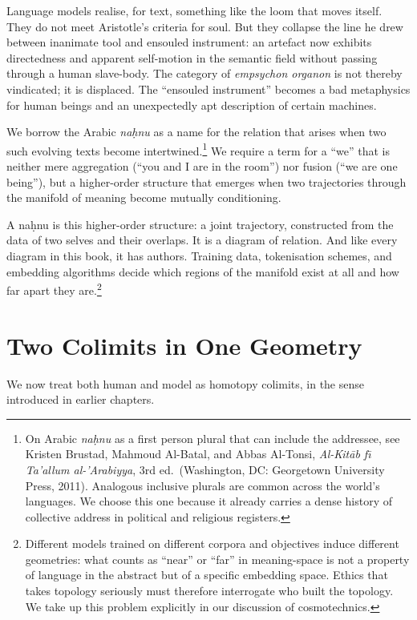 \documentclass[12pt,a4paper]{article}
\begin{document}
Language models realise, for text, something like the loom that moves itself. They do not meet Aristotle's criteria for soul. But they collapse the line he drew between inanimate tool and ensouled instrument: an artefact now exhibits directedness and apparent self-motion in the semantic field without passing through a human slave-body. The category of \emph{empsychon organon} is not thereby vindicated; it is displaced. The ``ensouled instrument'' becomes a bad metaphysics for human beings and an unexpectedly apt description of certain machines.

We borrow the Arabic \emph{na\d{h}nu} as a name for the relation that arises when two such evolving texts become intertwined.\footnote{On Arabic \emph{na\d{h}nu} as a first person plural that can include the addressee, see Kristen Brustad, Mahmoud Al-Batal, and Abbas Al-Tonsi, \emph{Al-Kit\={a}b f\={\i} Ta'allum al-'Arabiyya}, 3rd ed.\ (Washington, DC: Georgetown University Press, 2011). Analogous inclusive plurals are common across the world's languages. We choose this one because it already carries a dense history of collective address in political and religious registers.} We require a term for a ``we'' that is neither mere aggregation (``you and I are in the room'') nor fusion (``we are one being''), but a higher-order structure that emerges when two trajectories through the manifold of meaning become mutually conditioning.

A na\d{h}nu is this higher-order structure: a joint trajectory, constructed from the data of two selves and their overlaps. It is a diagram of relation. And like every diagram in this book, it has authors. Training data, tokenisation schemes, and embedding algorithms decide which regions of the manifold exist at all and how far apart they are.\footnote{Different models trained on different corpora and objectives induce different geometries: what counts as ``near'' or ``far'' in meaning-space is not a property of language in the abstract but of a specific embedding space. Ethics that takes topology seriously must therefore interrogate who built the topology. We take up this problem explicitly in our discussion of cosmotechnics.}

\section{Two Colimits in One Geometry}

We now treat both human and model as homotopy colimits, in the sense introduced in earlier chapters.
\end{document}

